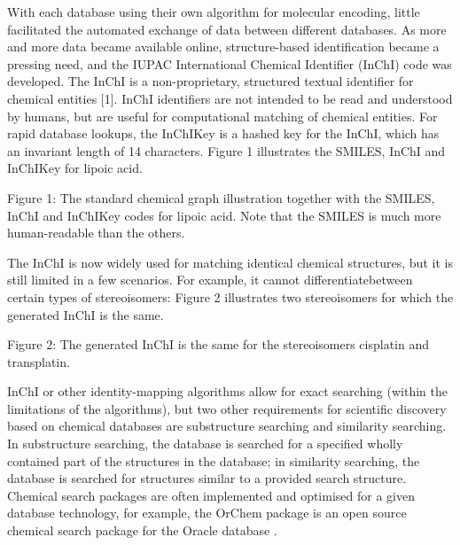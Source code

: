 \documentclass{sig-alternate}
\begin{document}
With each database using their own algorithm for molecular encoding, little
facilitated the automated exchange of data between different databases. As more
and more data became available online, structure-based identification became a
pressing need, and the IUPAC International Chemical Identifier (InChI) code was
developed. The InChI is a non-proprietary, structured textual identifier for
chemical entities [1]. InChI identifiers are not intended to be read and
understood by humans, but are useful for computational matching of chemical
entities. For rapid database lookups, the InChIKey is a hashed key for the
InChI, which has an invariant length of 14 characters. Figure 1 illustrates the
SMILES, InChI and InChIKey for lipoic acid.

Figure 1: The standard chemical graph illustration together with the SMILES,
InChI and InChIKey codes for lipoic acid. Note that the SMILES is much more
human-readable than the others.

The InChI is now widely used for matching identical chemical structures, but it
is still limited in a few scenarios. For example, it cannot differentiatebetween
certain types of stereoisomers: Figure 2 illustrates two stereoisomers for which
the generated InChI is the same.

Figure 2: The generated InChI is the same for the stereoisomers cisplatin and
transplatin.

InChI or other identity-mapping algorithms allow for exact searching (within the
limitations of the algorithms), but two other requirements for scientific
discovery based on chemical databases are substructure searching and similarity
searching. In substructure searching, the database is searched for a specified
wholly contained part of the structures in the database; in similarity
searching, the database is searched for structures similar to a provided search
structure. Chemical search packages are often implemented and optimised for a
given database technology, for example, the OrChem package is an open source
chemical search package for the Oracle database \cite{rijnbeek2009}.
\end{document}
